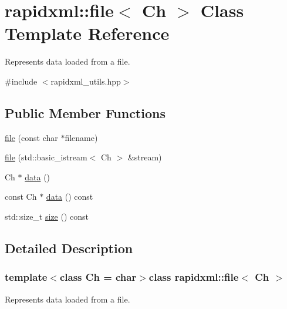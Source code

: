 \hypertarget{classrapidxml_1_1file}{\section{rapidxml\-:\-:file$<$ Ch $>$ Class Template Reference}
\label{classrapidxml_1_1file}
}


Represents data loaded from a file.  




{\ttfamily \#include $<$rapidxml\-\_\-utils.\-hpp$>$}

\subsection*{Public Member Functions}
\begin{DoxyCompactItemize}
\item 
\hyperlink{classrapidxml_1_1file_ae881a3cab1fe7152d45c92a8d7606cb3}{file} (const char $\ast$filename)
\item 
\hyperlink{classrapidxml_1_1file_a90707ccd991cc392dcf4bef37eed9d1f}{file} (std\-::basic\-\_\-istream$<$ Ch $>$ \&stream)
\item 
Ch $\ast$ \hyperlink{classrapidxml_1_1file_af1c71d65862c7af14e4708e32a80c1de}{data} ()
\item 
const Ch $\ast$ \hyperlink{classrapidxml_1_1file_aceb8f5ebd577c946a74b1ea3e2e0c576}{data} () const 
\item 
std\-::size\-\_\-t \hyperlink{classrapidxml_1_1file_a20191d167c6e00a88a44ca9a3a54e1c5}{size} () const 
\end{DoxyCompactItemize}


\subsection{Detailed Description}
\subsubsection*{template$<$class Ch = char$>$class rapidxml\-::file$<$ Ch $>$}

Represents data loaded from a file. 

